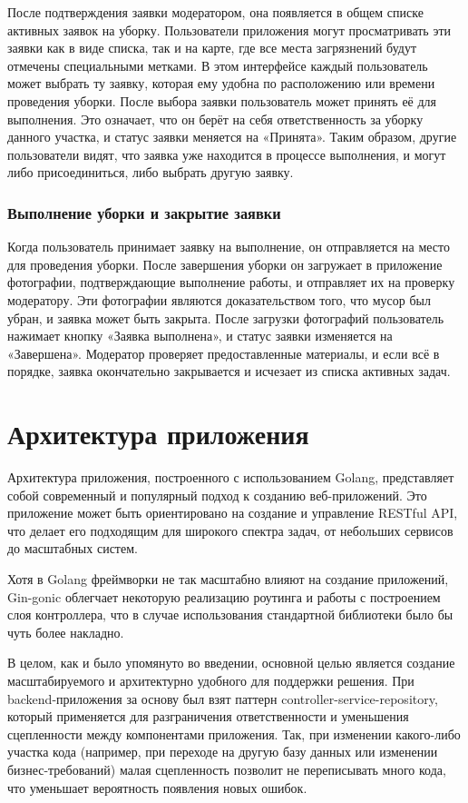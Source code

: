 \documentclass[diploma]{SCWorks}
\begin{document}
После подтверждения заявки модератором, она появляется в общем списке активных 
заявок на уборку. Пользователи приложения могут просматривать эти заявки 
как в виде списка, так и на карте, где все места загрязнений будут отмечены 
специальными метками. В этом интерфейсе каждый пользователь может выбрать ту 
заявку, которая ему удобна по расположению или времени проведения уборки. 
После выбора заявки пользователь может принять её для выполнения. Это 
означает, что он берёт на себя ответственность за уборку данного участка, 
и статус заявки меняется на «Принята». Таким образом, другие пользователи 
видят, что заявка уже находится в процессе выполнения, и могут либо 
присоединиться, либо выбрать другую заявку.

\subsubsection{Выполнение уборки и закрытие заявки}

Когда пользователь принимает заявку на выполнение, он отправляется на место 
для проведения уборки. После завершения уборки он загружает в приложение 
фотографии, подтверждающие выполнение работы, и отправляет их на проверку 
модератору. Эти фотографии являются доказательством того, что мусор был 
убран, и заявка может быть закрыта. После загрузки фотографий пользователь 
нажимает кнопку «Заявка выполнена», и статус заявки изменяется на «Завершена».
Модератор проверяет предоставленные материалы, и если всё в порядке, заявка 
окончательно закрывается и исчезает из списка активных задач.

\section{Архитектура приложения}

Архитектура приложения, построенного с использованием Golang, представляет
собой современный и популярный подход к созданию веб-приложений. Это приложение 
может быть ориентировано на создание и управление RESTful API, что делает его 
подходящим для широкого спектра задач, от небольших сервисов до масштабных 
систем.

Хотя в Golang фреймворки не так масштабно влияют на создание приложений, 
Gin-gonic облегчает некоторую реализацию роутинга и работы с построением слоя
контроллера, что в случае использования стандартной библиотеки было бы чуть 
более накладно.

В целом, как и было упомянуто во введении, основной целью является создание 
масштабируемого и архитектурно удобного для поддержки решения. При 
backend-приложения за основу был взят паттерн controller-service-repository,
который применяется для разграничения ответственности и уменьшения сцепленности
между компонентами приложения. Так, при изменении какого-либо участка кода 
(например, при переходе на другую базу данных или изменении бизнес-требований) 
малая сцепленность позволит не переписывать много кода, что уменьшает 
вероятность появления новых ошибок.
\end{document}
